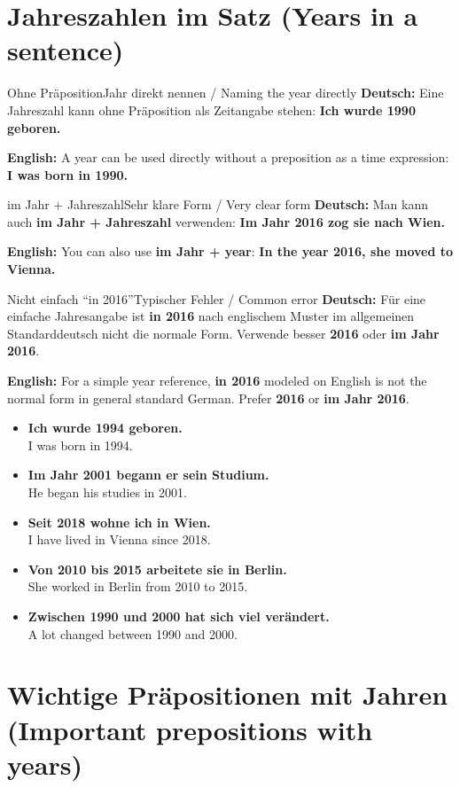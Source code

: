 \documentclass[a4paper,11pt]{article}
\newcommand{\GermanText}[1]{\textbf{Deutsch: }#1\par}
\newcommand{\EnglishText}[1]{{\small\color{SoftGray}\textbf{English: }#1\par}}
\newcommand{\ExampleItem}[2]{\item \textbf{#1}\\{\small\color{SoftGray}#2}}
\begin{document}
\section{Jahreszahlen im Satz \textnormal{(Years in a sentence)}}

\begin{grammarentry}{Ohne Präposition}{Jahr direkt nennen / Naming the year directly}
\GermanText{Eine Jahreszahl kann ohne Präposition als Zeitangabe stehen: \textbf{Ich wurde 1990 geboren.}}
\EnglishText{A year can be used directly without a preposition as a time expression: \textbf{I was born in 1990.}}
\end{grammarentry}

\begin{grammarentry}{im Jahr + Jahreszahl}{Sehr klare Form / Very clear form}
\GermanText{Man kann auch \textbf{im Jahr + Jahreszahl} verwenden: \textbf{Im Jahr 2016 zog sie nach Wien.}}
\EnglishText{You can also use \textbf{im Jahr + year}: \textbf{In the year 2016, she moved to Vienna.}}
\end{grammarentry}

\begin{grammarentry}{Nicht einfach ``in 2016''}{Typischer Fehler / Common error}
\GermanText{Für eine einfache Jahresangabe ist \textbf{in 2016} nach englischem Muster im allgemeinen Standarddeutsch nicht die normale Form. Verwende besser \textbf{2016} oder \textbf{im Jahr 2016}.}
\EnglishText{For a simple year reference, \textbf{in 2016} modeled on English is not the normal form in general standard German. Prefer \textbf{2016} or \textbf{im Jahr 2016}.}
\end{grammarentry}

\begin{exbox}
\begin{itemize}
\ExampleItem{Ich wurde 1994 geboren.}{I was born in 1994.}
\ExampleItem{Im Jahr 2001 begann er sein Studium.}{He began his studies in 2001.}
\ExampleItem{Seit 2018 wohne ich in Wien.}{I have lived in Vienna since 2018.}
\ExampleItem{Von 2010 bis 2015 arbeitete sie in Berlin.}{She worked in Berlin from 2010 to 2015.}
\ExampleItem{Zwischen 1990 und 2000 hat sich viel verändert.}{A lot changed between 1990 and 2000.}
\end{itemize}
\end{exbox}

\section{Wichtige Präpositionen mit Jahren \textnormal{(Important prepositions with years)}}
\end{document}
